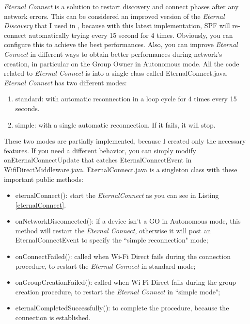 \emph{Eternal Connect} is a solution to restart discovery and connect phases after any network errors. This can be considered an improved version of the 	\emph{Eternal Discovery} that I used in , because with this latest implementation, SPF will re-connect automatically trying every 15 second for 4 times. Obviously, you can configure this to achieve the best performances. Also, you can improve \emph{Eternal Connect} in different ways to obtain better performances during network's creation, in particular on the Group Owner in Autonomous mode. All the code related to \emph{Eternal Connect} is into a single class called \textsf{EternalConnect.java}.
\emph{Eternal Connect} has two different modes:
\begin{enumerate}
	\item standard: with automatic reconnection in a loop cycle for 4 times every 15 seconds.
	\item simple: with a single automatic reconnection. If it fails, it will stop.
\end{enumerate}
These two modes are partially implemented, because I created only the necessary features. If you need a different behavior, you can simply modify \textsf{onEternalConnectUpdate} that catches \textsf{EternalConnectEvent} in \textsf{WifiDirectMiddleware.java}. \textsf{EternalConnect.java} is a singleton class with these important public methods:
\begin{itemize}
	\item \textsf{eternalConnect()}: start the \emph{EternalConnect} as you can see in Listing 	\ref{eternalConnect}.
	\item \textsf{onNetworkDisconnected()}: if a device isn't a GO in Autonomous mode, this method will restart the \emph{Eternal Connect}, otherwise it will post an \textsf{EternalConnectEvent} to specify the ``simple reconnection" mode;
	\item \textsf{onConnectFailed()}: called when Wi-Fi Direct fails during the connection procedure, to restart the \emph{Eternal Connect} in standard mode;
	\item \textsf{onGroupCreationFailed()}: called when Wi-Fi Direct fails during the group creation procedure, to restart the \emph{Eternal Connect} in ``simple mode";
	\item \textsf{eternalCompletedSuccessfully()}: to complete the procedure, because the connection is established.
\end{itemize}


